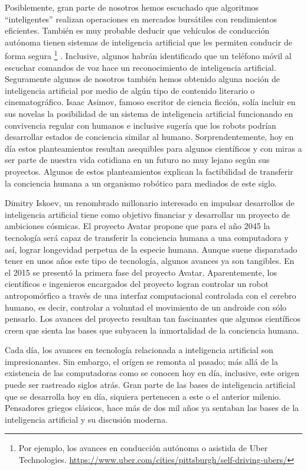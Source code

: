 \documentclass[letterpaper,12pt, spanish, oneside]{book} %
\let\oldfootnote\footnote
\renewcommand{\footnote}[1]{%
  \begingroup%
  \linespread{1.2}%
  \oldfootnote{#1}%
  \endgroup%
}
\begin{document}
Posiblemente, gran parte de nosotros hemos escuchado que algoritmos “inteligentes” realizan operaciones en mercados bursátiles con rendimientos eficientes. También es muy probable deducir que vehículos de conducción autónoma tienen sistemas de inteligencia artificial que les permiten conducir de forma segura\footnote{Por ejemplo, los avances en conducción autónoma o asistida de Uber Technologies. \url{https://www.uber.com/cities/pittsburgh/self-driving-ubers/}}. Inclusive, algunos habrán identificado que un teléfono móvil al escuchar comandos de voz hace un reconocimiento de inteligencia artificial. Seguramente algunos de nosotros también hemos obtenido alguna noción de inteligencia artificial por medio de algún tipo de contenido literario o cinematográfico. Isaac Asimov, famoso escritor de ciencia ficción, solía incluir en sus novelas la posibilidad de un sistema de inteligencia artificial funcionando en convivencia regular con humanos e inclusive sugería que los robots podrían desarrollar estados de conciencia similar al humano. Sorprendentemente, hoy en día estos planteamientos resultan asequibles para algunos científicos y con miras a ser parte de nuestra vida cotidiana en un futuro no muy lejano según sus proyectos. Algunos de estos planteamientos explican la factibilidad de transferir la conciencia humana a un organismo robótico para mediados de este siglo. 

Dimitry Iskoev, un renombrado millonario interesado en impulsar desarrollos de inteligencia artificial tiene como objetivo financiar y desarrollar un proyecto de ambiciones cósmicas. El proyecto Avatar propone que para el año 2045 la tecnología será capaz de transferir la conciencia humana a una computadora y así, lograr longevidad perpetua de la especie humana. Aunque suene disparatado tener en unos años este tipo de tecnología, algunos avances ya son tangibles. En el 2015 se presentó la primera fase del proyecto Avatar. Aparentemente, los científicos e ingenieros encargados del proyecto logran controlar un robot antropomórfico a través de una interfaz computacional controlada con el cerebro humano, es decir, controlar a voluntad el movimiento de un androide con sólo pensarlo. Los avances del proyecto resultan tan fascinantes que algunos científicos creen que sienta las bases que subyacen la inmortalidad de la conciencia humana.

Cada día, los avances en tecnología relacionada a inteligencia artificial son impresionantes. Sin embargo, el orígen se remonta al pasado; más allá de la existencia de las computadoras como se conocen hoy en día, inclusive, este origen puede ser rastreado siglos atrás. Gran parte de las bases de inteligencia artificial que se desarrolla hoy en día, siquiera pertenecen a este o el anterior milenio. Pensadores griegos clásicos, hace más de dos mil años ya sentaban las bases de la inteligencia artificial y su discusión moderna.
\end{document}
